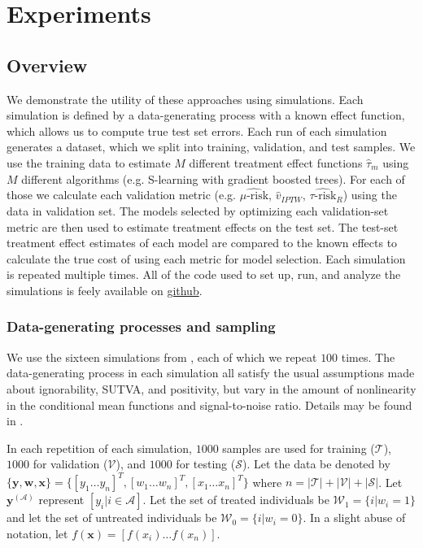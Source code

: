 \section{Experiments}
\label{simulations}

\subsection{Overview}

We demonstrate the utility of these approaches using simulations. Each simulation is defined by a data-generating process with a known effect function, which allows us to compute true test set errors. Each run of each simulation generates a dataset, which we split into training, validation, and test samples. We use the training data to estimate $M$ different treatment effect functions $\hat\tau_m$ using $M$ different algorithms (e.g. S-learning with gradient boosted trees). For each of those we calculate each validation metric (e.g. $\widehat{\mu\text{-risk}}$, $\hat v_{IPTW}$, $\widehat{\tau\text{-risk}}_{R}$) using the data in validation set. The models selected by optimizing each validation-set metric are then used to estimate treatment effects on the test set. The test-set treatment effect estimates of each model are compared to the known effects to calculate the true cost of using each metric for model selection. Each simulation is repeated multiple times. All of the code used to set up, run, and analyze the simulations is feely available on \href{https://github.com/som-shahlab/ITE-model-selection}{github}.

\subsubsection{Data-generating processes and sampling}

We use the sixteen simulations from \citet{Powers:2017wd}, each of which we repeat $100$ times. The data-generating process in each simulation all satisfy the usual assumptions made about ignorability, SUTVA, and positivity, but vary in the amount of nonlinearity in the conditional mean functions and signal-to-noise ratio. Details may be found in \citet{Powers:2017wd}. 

In each repetition of each simulation, $1000$ samples are used for training ($\mathcal{T}$), $1000$ for validation ($\mathcal{V}$), and $1000$ for testing ($\mathcal{S}$). Let the data be denoted by $\{\bm y, \bm w, \bm x\} = \{[y_1 \dots y_n]^T, [w_1 \dots w_n]^T, [x_1 \dots x_n]^T\}$ where $n = |\mathcal{T}| + |\mathcal{V} | + |\mathcal{S}|$. Let $\bm y^{(\mathcal A)}$ represent $[y_i | i \in \mathcal A]$. Let the set of treated individuals be $\mathcal W_1 = \{i | w_i =1\}$ and let the set of untreated individuals be $\mathcal W_0 = \{i | w_i =0\}$. In a slight abuse of notation, let $f(\bm x) = [f(x_i) \dots f(x_n)]$.

